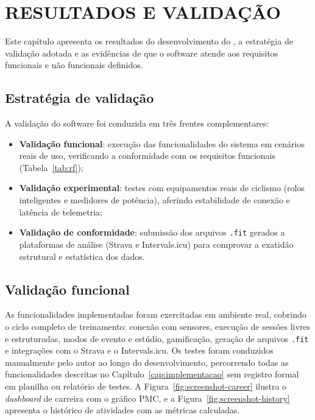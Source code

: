 
\chapter{RESULTADOS E VALIDAÇÃO}
\label{cap:resultados}

Este capítulo apresenta os resultados do desenvolvimento do \argus{}, a
estratégia de validação adotada e as evidências de que o software atende aos
requisitos funcionais e não funcionais definidos.

\section{Estratégia de validação}
\label{sec:estrategia-validacao}

A validação do software foi conduzida em três frentes complementares:

\begin{itemize}
    \item \textbf{Validação funcional}: execução das funcionalidades do sistema
        em cenários reais de uso, verificando a conformidade com os requisitos
        funcionais (Tabela~\ref{tab:rf});
    \item \textbf{Validação experimental}: testes com equipamentos reais de
        ciclismo (rolos inteligentes e medidores de potência), aferindo
        estabilidade de conexão e latência de telemetria;
    \item \textbf{Validação de conformidade}: submissão dos arquivos
        \texttt{.fit} gerados a plataformas de análise (Strava e Intervals.icu)
        para comprovar a exatidão estrutural e estatística dos dados.
\end{itemize}

\section{Validação funcional}
\label{sec:validacao-funcional}

As funcionalidades implementadas foram exercitadas em ambiente real, cobrindo o
ciclo completo de treinamento: conexão com sensores, execução de sessões
livres e estruturadas, modos de evento e estúdio, gamificação, geração de
arquivos \texttt{.fit} e integrações com o Strava e o Intervals.icu. Os testes
foram conduzidos manualmente pelo autor ao longo do desenvolvimento, percorrendo
todas as funcionalidades descritas no Capítulo~\ref{cap:implementacao} sem
registro formal em planilha ou relatório de testes. A Figura~\ref{fig:screenshot-career}
ilustra o \textit{dashboard} de carreira com o gráfico PMC, e a
Figura~\ref{fig:screenshot-history} apresenta o histórico de atividades com as
métricas calculadas.

